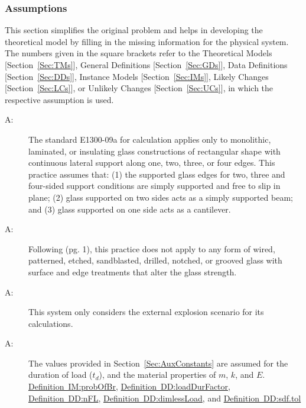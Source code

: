\documentclass[12pt]{article}
\newcounter{assumpnum}
\newcommand{\atheassumpnum}{A\theassumpnum}
\begin{document}
\subsubsection{Assumptions}
\label{Sec:Assumps}
This section simplifies the original problem and helps in developing the theoretical model by filling in the missing information for the physical system. The numbers given in the square brackets refer to the Theoretical Models {[}Section~\ref{Sec:TMs}{]}, General Definitions {[}Section~\ref{Sec:GDs}{]}, Data Definitions {[}Section~\ref{Sec:DDs}{]}, Instance Models {[}Section~\ref{Sec:IMs}{]}, Likely Changes {[}Section~\ref{Sec:LCs}{]}, or Unlikely Changes {[}Section~\ref{Sec:UCs}{]}, in which the respective assumption is used.
\begin{description}
\item[\atheassumpnum\label{A:glassType}:]The standard E1300-09a for calculation applies only to monolithic, laminated, or insulating glass constructions of rectangular shape with continuous lateral support along one, two, three, or four edges. This practice assumes that: (1) the supported glass edges for two, three and four-sided support conditions are simply supported and free to slip in plane; (2) glass supported on two sides acts as a simply supported beam; and (3) glass supported on one side acts as a cantilever.
\end{description}
\begin{description}
\item[\atheassumpnum\label{A:glassCondition}:]Following \cite{astm2009} (pg. 1), this practice does not apply to any form of wired, patterned, etched, sandblasted, drilled, notched, or grooved glass with surface and edge treatments that alter the glass strength.
\end{description}
\begin{description}
\item[\atheassumpnum\label{A:explainScenario}:]This system only considers the external explosion scenario for its calculations.
\end{description}
\begin{description}
\item[\atheassumpnum\label{A:standardValues}:]The values provided in Section~\ref{Sec:AuxConstants} are assumed for the duration of load (${t_{d}}$), and the material properties of $m$, $k$, and $E$. \hyperref[IM:probOfBr]{Definition~IM:probOfBr}, \hyperref[DD:loadDurFactor]{Definition~DD:loadDurFactor}, \hyperref[DD:nFL]{Definition~DD:nFL}, \hyperref[DD:dimlessLoad]{Definition~DD:dimlessLoad}, and \hyperref[DD:sdf.tol]{Definition~DD:sdf.tol}
\end{description}
\end{document}
